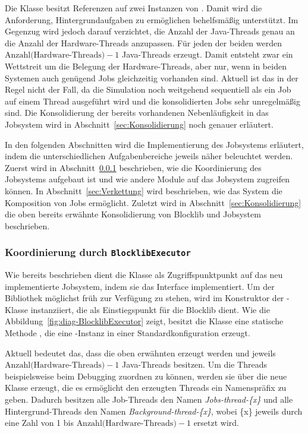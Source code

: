 Die Klasse \classBlocklibExecutor{} besitzt Referenzen auf zwei Instanzen von \classScheduledThreadPoolExecutor{}. Damit wird die Anforderung, Hintergrundaufgaben zu ermöglichen behelfsmäßig unterstützt. Im Gegenzug wird jedoch darauf verzichtet, die Anzahl der Java-Threads genau an die Anzahl der Hardware-Threads anzupassen. Für jeden der beiden \classScheduledThreadPoolExecutor{} werden $\text{Anzahl(Hardware-Threads)} - 1$ Java-Threads erzeugt. Damit entsteht zwar ein Wettstreit um die Belegung der Hardware-Threads, aber nur, wenn in beiden Systemen auch genügend Jobs gleichzeitig vorhanden sind. Aktuell ist das in der Regel nicht der Fall, da die Simulation noch weitgehend sequentiell als ein Job auf einem Thread ausgeführt wird und die konsolidierten Jobs sehr unregelmäßig sind. Die Konsolidierung der bereits vorhandenen Nebenläufigkeit in das Jobsystem wird in Abschnitt~\ref{sec:Konsolidierung} noch genauer erläutert. 

In den folgenden Abschnitten wird die Implementierung des Jobsystems erläutert, indem die unterschiedlichen Aufgabenbereiche jeweils näher beleuchtet werden. Zuerst wird in Abschnitt~\ref{sec:Koordinierung} beschrieben, wie die Koordinierung des Jobsystems aufgebaut ist und wie andere Module auf das Jobsystem zugreifen können. In Abschnitt~\ref{sec:Verkettung} wird beschrieben, wie das System die Komposition von Jobs ermöglicht. Zuletzt wird in Abschnitt~\ref{sec:Konsolidierung} die oben bereits erwähnte Konsolidierung von Blocklib und Jobsystem beschrieben.

\subsubsection{Koordinierung durch \texttt{BlocklibExecutor}}\label{sec:Koordinierung}

Wie bereits beschrieben dient die Klasse \classBlocklibExecutor{} als Zugriffspunktpunkt auf das neu implementierte Jobsystem, indem sie das Interface \classBlocklibExecutorService{} implementiert. Um der Bibliothek möglichst früh zur Verfügung zu stehen, wird \classBlocklibExecutor{} im Konstruktor der \classGame{}-Klasse instanziiert, die als Einstiegspunkt für die Blocklib dient. Wie die Abbildung~\vref{fig:diag-BlocklibExecutor} zeigt, besitzt die Klasse \classBlocklibExecutor{} eine statische Methode , die eine \classBlocklibExecutor{}-Instanz in einer Standardkonfiguration erzeugt.

Aktuell bedeutet das, dass die oben erwähnten \classScheduledThreadPoolExecutor{} erzeugt werden und jeweils $\text{Anzahl(Hardware-Threads)} - 1$ Java-Threads besitzen. Um die Threads beispielsweise beim Debugging zuordnen zu können, werden sie über die neue Klasse \classNamedThreadFactory{} erzeugt, die es ermöglicht den erzeugten Threads ein Namenspräfix zu geben. Dadurch besitzen alle Job-Threads den Namen \emph{Jobs-thread-\{x\}} und alle Hintergrund-Threads den Namen \emph{Background-thread-\{x\}}, wobei \{x\} jeweils durch eine Zahl von 1 bis $\text{Anzahl(Hardware-Threads)} - 1$ ersetzt wird.

